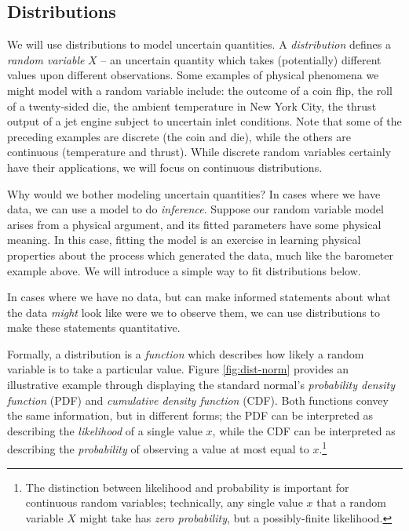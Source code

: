 \documentclass[../primer.tex]{subfiles}
\begin{document}
\subsection{Distributions}
We will use distributions to model uncertain quantities. A \emph{distribution}
defines a \emph{random variable} $X$ -- an uncertain quantity which takes
(potentially) different values upon different observations. Some examples of
physical phenomena we might model with a random variable include: the outcome of
a coin flip, the roll of a twenty-sided die, the ambient temperature in New York
City, the thrust output of a jet engine subject to uncertain inlet conditions.
Note that some of the preceding examples are discrete (the coin and die), while
the others are continuous (temperature and thrust). While discrete random
variables certainly have their applications, we will focus on continuous
distributions.

Why would we bother modeling uncertain quantities? In cases where we have data,
we can use a model to do \emph{inference}. Suppose our random variable model
arises from a physical argument, and its fitted parameters have some physical
meaning. In this case, fitting the model is an exercise in learning physical
properties about the process which generated the data, much like the barometer
example above. We will introduce a simple way to fit distributions below.

In cases where we have no data, but can make informed statements about what the
data \emph{might} look like were we to observe them, we can use distributions to
make these statements quantitative.

Formally, a distribution is a \emph{function} which describes how likely a
random variable is to take a particular value. Figure \ref{fig:dist-norm}
provides an illustrative example through displaying the standard normal's
\emph{probability density function} (PDF) and \emph{cumulative density function}
(CDF). Both functions convey the same information, but in different forms; the
PDF can be interpreted as describing the \emph{likelihood} of a single value
$x$, while the CDF can be interpreted as describing the \emph{probability} of
observing a value at most equal to $x$.\footnote{The distinction between
  likelihood and probability is important for continuous random variables;
  technically, any single value $x$ that a random variable $X$ might take has
  \emph{zero probability}, but a possibly-finite likelihood.}
\end{document}
